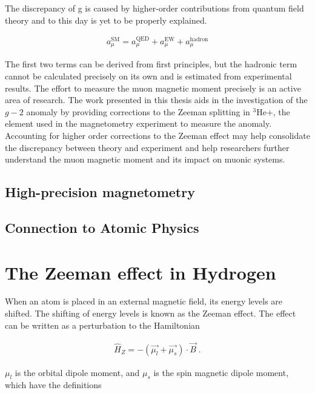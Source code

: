         \noindent The discrepancy of g is caused by higher-order contributions from quantum field theory and to this day is yet to be properly explained. 

        \begin{align}
            a^{\text{SM}}_\mu = a_\mu^{\text{QED}} + a_\mu^{\text{EW}} + a_\mu^{\text{hadron}}
        \end{align}

        \noindent The first two terms can be derived from first principles, but the hadronic term cannot be calculated precisely on its own and is estimated from experimental results. The effort to measure the muon magnetic moment precisely is an active area of research. The work presented in this thesis aids in the investigation of the $g-2$ anomaly by providing corrections to the Zeeman splitting in $^3$He$+$, the element used in the magnetometry experiment to measure the anomaly. Accounting for higher order corrections to the Zeeman effect may help consolidate the discrepancy between theory and experiment and help researchers further understand the muon magnetic moment and its impact on muonic systems.

        \subsection{High-precision magnetometry}\label{sec:High-Precision-magnetometry}
        \subsection{Connection to Atomic Physics}\label{sec:Connection_To_AMO}

    \section{The Zeeman effect in Hydrogen}\label{sec:Ordinary_Zeeman}
        When an atom is placed in an external magnetic field, its energy levels are shifted. The shifting of energy levels is known as the Zeeman effect. The effect can be written as a perturbation to the Hamiltonian \cite{Griffiths_2018}

        \begin{align}
            \hat{H}_Z = - \left(\vec{\mu_l} + \vec{\mu_s} \right) \cdot \vec{B}\;.
        \end{align}

        \noindent $\mu_l$ is the orbital dipole moment, and $\mu_s$ is the spin magnetic dipole moment, which have the definitions


